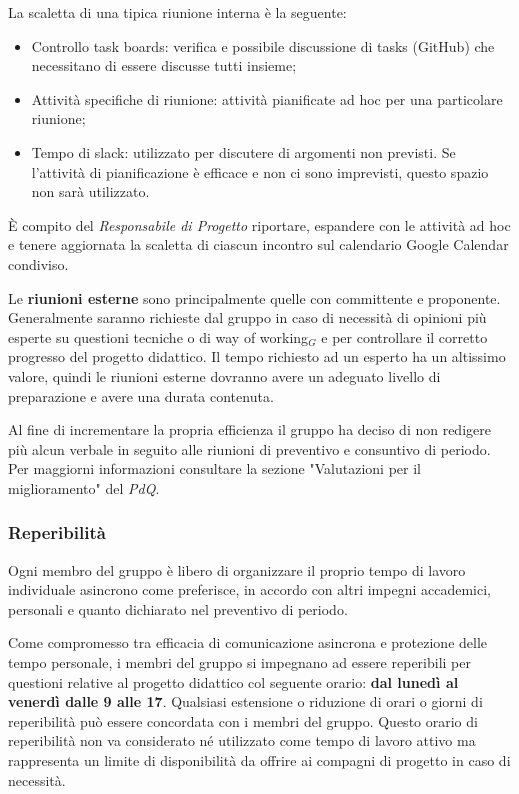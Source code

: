 La scaletta di una tipica riunione interna è la seguente:
\begin{itemize}
  \item Controllo task boards: verifica e possibile discussione di tasks (GitHub) che necessitano di essere discusse tutti insieme;
  \item Attività specifiche di riunione: attività pianificate ad hoc per una particolare riunione;
  \item Tempo di slack: utilizzato per discutere di argomenti non previsti. Se l'attività di pianificazione è efficace e non ci sono imprevisti, questo spazio non sarà utilizzato.
\end{itemize}
È compito del \textit{Responsabile di Progetto} riportare, espandere con le attività ad hoc e tenere aggiornata la scaletta di ciascun incontro sul calendario Google Calendar condiviso.

Le \textbf{riunioni esterne} sono principalmente quelle con committente e proponente. Generalmente saranno richieste dal gruppo in caso di necessità di opinioni più esperte su questioni tecniche o di way of working$_G$ e per controllare il corretto progresso del progetto didattico. Il tempo richiesto ad un esperto ha un altissimo valore, quindi le riunioni esterne dovranno avere un adeguato livello di preparazione e avere una durata contenuta.

Al fine di incrementare la propria efficienza il gruppo ha deciso di non redigere più alcun verbale in seguito alle riunioni di preventivo e consuntivo di periodo. Per maggiorni informazioni consultare la sezione "Valutazioni per il miglioramento" del \textit{PdQ}.




\subsubsection{Reperibilità}
Ogni membro del gruppo è libero di organizzare il proprio tempo di lavoro individuale asincrono come preferisce, in accordo con altri impegni accademici, personali e quanto dichiarato nel preventivo di periodo.

Come compromesso tra efficacia di comunicazione asincrona e protezione delle tempo personale, i membri del gruppo si impegnano ad essere reperibili per questioni relative al progetto didattico col seguente orario: \textbf{dal lunedì al venerdì dalle 9 alle 17}. Qualsiasi estensione o riduzione di orari o giorni di reperibilità può essere concordata con i membri del gruppo. Questo orario di reperibilità non va considerato né utilizzato come tempo di lavoro attivo ma rappresenta un limite di disponibilità da offrire ai compagni di progetto in caso di necessità.

